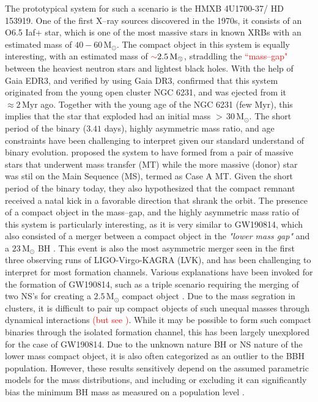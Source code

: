 \documentclass[linenumbers,trackchanges,twocolumn]{aastex701}
\newcommand{\Mdot}{\mathrm{M}_{\odot}}
\newcommand{\Myr}{\mathrm{Myr}}
\newcommand{\red}{\textcolor{red}}
\begin{document}
The prototypical system for such a scenario is the HMXB 4U1700-37/ HD 153919. One of the first X--ray sources discovered in the 1970s, it consists of an O6.5 Iaf+ star, which is one of the most massive stars in known XRBs with an estimated mass of $40-60\,\Mdot$. The compact object in this system is equally interesting, with an estimated mass of $\red{\sim} 2.5\,\Mdot$, straddling the \red{``mass--gap"} between the heaviest neutron stars and lightest black holes. With the help of Gaia EDR3, and verified by \citep{2022MNRAS.511.4123H} using Gaia DR3, \citep{2021A&A...655A..31V} confirmed that this system originated from the young open cluster NGC 6231, and was ejected from it $\approx 2\,\Myr$ ago. Together with the young age of the NGC 6231 (few $\Myr$), this implies that the star that exploded had an initial mass $>\,30\,\Mdot$. The short period of the binary ($3.41$ days), highly asymmetric mass ratio, and age constraints have been challenging to interpret given our standard understand of binary evolution. \citep{2021A&A...655A..31V} proposed the system to have formed from a pair of massive stars that underwent mass transfer (MT) while the more massive (donor) star was stil on the Main Sequence (MS), termed as Case A MT. Given the short period of the binary today, they also hypothesized that the compact remnant received a natal kick in a favorable direction that shrank the orbit. The presence of a compact object in the mass--gap, and the highly asymmetric mass ratio of this system is particularly interesting, as it is very similar to GW190814, which also consisted of a merger between a compact object in the \textit{"lower mass gap"} and a $23\,\Mdot$ BH \citep{2020ApJ...896L..44A}. This event is also the most asymmetric merger seen in the first three observing runs of LIGO-Virgo-KAGRA (LVK), and has been challenging to interpret for most formation channels. Various explanations have been invoked for the formation of GW190814, such as a triple scenario requiring the merging of two NS's for creating a $2.5\,\Mdot$ compact object \citep{2021MNRAS.500.1817L}. Due to the mass segration in clusters, it is difficult to pair up compact objects of such unequal masses through dynamical interactions \red{(but see \citep{2021ApJ...908L..38A})}. While it may be possible to form such compact binaries through the isolated formation channel, this has been largely unexplored for the case of GW190814. Due to the unknown nature BH or NS nature of the lower mass compact object, it is also often categorized as an outlier to the BBH population. However, these results sensitively depend on the assumed parametric models for the mass distributions, and including or excluding it can significantly bias the minimum BH mass as measured on a population level \citep{2025arXiv250814159C,2021ApJ...913L...7A,2022ApJ...926...34E,2022ApJ...931..108F}. 
\end{document}
